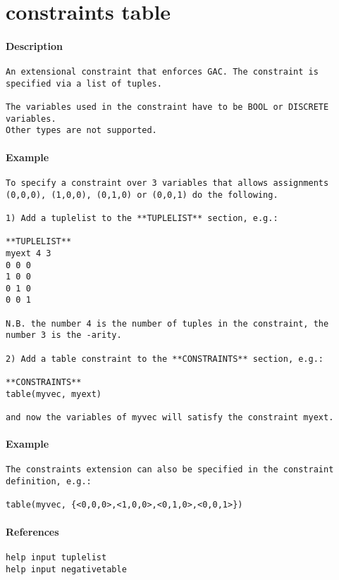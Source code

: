 \section{constraints table}
\paragraph{Description}
{\footnotesize
\begin{verbatim}
An extensional constraint that enforces GAC. The constraint is
specified via a list of tuples.

The variables used in the constraint have to be BOOL or DISCRETE variables.
Other types are not supported.
\end{verbatim}
}
\paragraph{Example}
{\footnotesize
\begin{verbatim}
To specify a constraint over 3 variables that allows assignments
(0,0,0), (1,0,0), (0,1,0) or (0,0,1) do the following.

1) Add a tuplelist to the **TUPLELIST** section, e.g.:

**TUPLELIST**
myext 4 3
0 0 0
1 0 0
0 1 0
0 0 1

N.B. the number 4 is the number of tuples in the constraint, the 
number 3 is the -arity.

2) Add a table constraint to the **CONSTRAINTS** section, e.g.:

**CONSTRAINTS**
table(myvec, myext)

and now the variables of myvec will satisfy the constraint myext.
\end{verbatim}
}
\paragraph{Example}
{\footnotesize
\begin{verbatim}
The constraints extension can also be specified in the constraint
definition, e.g.:

table(myvec, {<0,0,0>,<1,0,0>,<0,1,0>,<0,0,1>})
\end{verbatim}
}
\paragraph{References}
{\footnotesize
\begin{verbatim}
help input tuplelist
help input negativetable
\end{verbatim}
}
